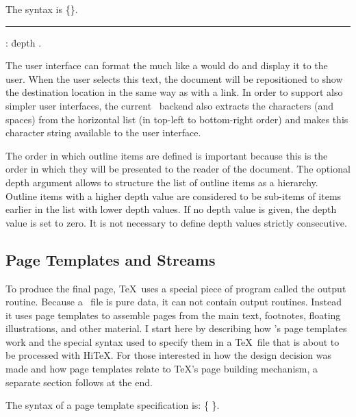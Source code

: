 The syntax is
\medskip
\prim{}
  \.{\{}\.{\}}.
\medskip
\rule {}: \.{depth} .
\medskip

The user interface can format the  much like 
a  would do and display it to the user. When the user selects
this text, the document will be repositioned to show the destination location
in the same way as with a link. In order to support also simpler
user interfaces, the current \HINT\ backend also extracts the characters
(and spaces) from the horizontal list (in top-left to bottom-right order)
and makes this character string available to the user interface.


The order in which outline items are defined is important because
this is the order in which they will be presented to the reader of the
document. The optional depth argument allows to structure 
the list of outline items as a hierarchy. Outline items with a higher depth value are considered to be sub-items of items earlier in the list with lower
depth values. If no depth value is given, the depth value is set to zero.
It is not necessary to define depth values strictly consecutive.


\subsection{Page Templates and Streams}

To produce the final page, \TeX\ uses a special piece of program
called the output routine.  Because a \HINT\
file is pure data, it can not contain output routines.  Instead it
uses page templates to assemble pages from the main text, footnotes,
floating illustrations, and other material.  I start here by
describing how \HINT's page templates work and the special syntax used
to specify them in a \TeX\ file that is about to be processed with
Hi\TeX.  For those interested in how the design decision was made and
how page templates relate to \TeX's page building mechanism, a
separate section follows at the end.

The syntax of a page template specification is:
\medskip
\prim{}
 \opt{\.{=}}  
  
\.{\{} \.{\}}.
\medskip

